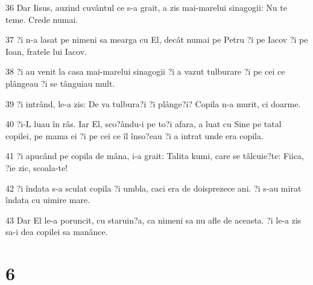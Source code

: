 \par 36 Dar Iisus, auzind cuvântul ce s-a grait, a zis mai-marelui sinagogii: Nu te teme. Crede numai.
\par 37 ?i n-a lasat pe nimeni sa mearga cu El, decât numai pe Petru ?i pe Iacov ?i pe Ioan, fratele lui Iacov.
\par 38 ?i au venit la casa mai-marelui sinagogii ?i a vazut tulburare ?i pe cei ce plângeau ?i se tânguiau mult.
\par 39 ?i intrând, le-a zis: De va tulbura?i ?i plânge?i? Copila n-a murit, ci doarme.
\par 40 ?i-L luau în râs. Iar El, sco?ându-i pe to?i afara, a luat cu Sine pe tatal copilei, pe mama ei ?i pe cei ce îl înso?eau ?i a intrat unde era copila.
\par 41 ?i apucând pe copila de mâna, i-a grait: Talita kumi, care se tâlcuie?te: Fiica, ?ie zic, scoala-te!
\par 42 ?i îndata s-a sculat copila ?i umbla, caci era de doisprezece ani. ?i s-au mirat îndata cu uimire mare.
\par 43 Dar El le-a poruncit, cu staruin?a, ca nimeni sa nu afle de aceasta. ?i le-a zis sa-i dea copilei sa manânce.

\chapter{6}

